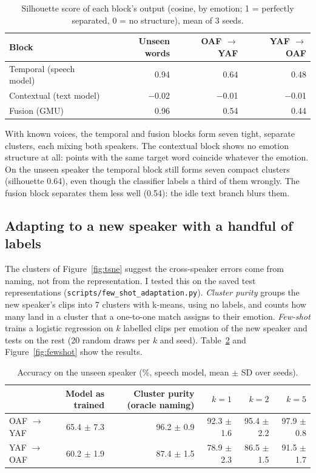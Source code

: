 \documentclass[11pt,a4paper]{article}
\newcommand{\code}[1]{\texttt{#1}}
\begin{document}
\begin{table}[H]\centering\small
\caption{Silhouette score of each block's output (cosine, by emotion; 1 = perfectly separated, 0 = no structure),
mean of 3 seeds.}
\label{tab:sil}
\begin{tabular}{@{}lrrr@{}}
\toprule
Block & Unseen words & OAF $\to$ YAF & YAF $\to$ OAF \\
\midrule
Temporal (speech model) & 0.94 & 0.64 & 0.48 \\
Contextual (text model) & $-$0.02 & $-$0.01 & $-$0.01 \\
Fusion (GMU) & 0.96 & 0.54 & 0.44 \\
\bottomrule
\end{tabular}
\end{table}

With known voices, the temporal and fusion blocks form seven tight, separate clusters, each mixing both speakers.
The contextual block shows no emotion structure at all: points with the same target word coincide whatever the
emotion. On the unseen speaker the temporal block still forms seven compact clusters (silhouette 0.64), even though
the classifier labels a third of them wrongly. The fusion block separates them less well (0.54): the idle text
branch blurs them.

\subsection{Adapting to a new speaker with a handful of labels}
\label{sec:fewshot}
The clusters of Figure~\ref{fig:tsne} suggest the cross-speaker errors come from naming, not from the
representation. I tested this on the saved test representations (\code{scripts/few\_shot\_adaptation.py}).
\emph{Cluster purity} groups the new speaker's clips into 7 clusters with k-means, using no labels, and counts how
many land in a cluster that a one-to-one match assigns to their emotion. \emph{Few-shot} trains a logistic
regression on $k$ labelled clips per emotion of the new speaker and tests on the rest (20 random draws per $k$ and
seed). Table~\ref{tab:fewshot} and Figure~\ref{fig:fewshot} show the results.

\begin{table}[!htbp]\centering\small
\caption{Accuracy on the unseen speaker (\%, speech model, mean $\pm$ SD over seeds).}
\label{tab:fewshot}
\begin{tabular}{@{}lrrrrr@{}}
\toprule
 & Model as trained & Cluster purity (oracle naming) & $k = 1$ & $k = 2$ & $k = 5$ \\
\midrule
OAF $\to$ YAF & 65.4 $\pm$ 7.3 & 96.2 $\pm$ 0.9 & 92.3 $\pm$ 1.6 & 95.4 $\pm$ 2.2 & 97.9 $\pm$ 0.8 \\
YAF $\to$ OAF & 60.2 $\pm$ 1.9 & 87.4 $\pm$ 1.5 & 78.9 $\pm$ 2.3 & 86.5 $\pm$ 1.5 & 91.5 $\pm$ 1.7 \\
\bottomrule
\end{tabular}
\end{table}
\end{document}
